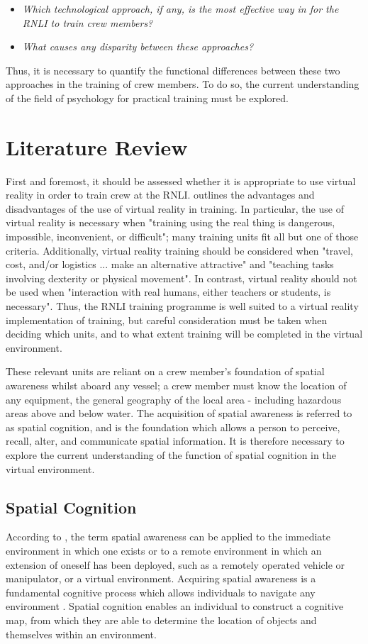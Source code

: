 \documentclass[ %
                    author={Elis Jones},
                supervisor={Dr. Kirsten Cater},
                    degree={BSc},
                     title={The Effect of Presentation Medium on Spatial Cognition},
                  subtitle={in the Virtual Environment},
                      year={2018} ]{dissertation}
\begin{document}
\begin{itemize}
    \item \textit{Which technological approach, if any, is the most effective way in for the RNLI to train crew members?}
    \item \textit{What causes any disparity between these approaches?}
\end{itemize}

Thus, it is necessary to quantify the functional differences between these two approaches in the training of crew members. To do so, the current understanding of the field of psychology for practical training must be explored.

\section{Literature Review}\label{litreview}
First and foremost, it should be assessed whether it is appropriate to use virtual reality in order to train crew at the RNLI. \cite{Pantelidis2010} outlines the advantages and disadvantages of the use of virtual reality in training. In particular, the use of virtual reality is necessary when "training using the real thing is dangerous, impossible, inconvenient, or difficult"; many training units fit all but one of those criteria. Additionally, virtual reality training should be considered when "travel, cost, and/or logistics ... make an alternative attractive" and "teaching tasks involving dexterity or physical movement". In contrast, virtual reality should not be used when "interaction with real humans, either teachers or students, is necessary". Thus, the RNLI training programme is well suited to a virtual reality implementation of training, but careful consideration must be taken when deciding which units, and to what extent training will be completed in the virtual environment. 

These relevant units are reliant on a crew member's foundation of spatial awareness whilst aboard any vessel; a crew member must know the location of any equipment, the general geography of the local area - including hazardous areas above and below water. The acquisition of spatial awareness is referred to as spatial cognition, and is the foundation which allows a person to perceive, recall, alter, and communicate spatial information. It is therefore necessary to explore the current understanding of the function of spatial cognition in the virtual environment.

\subsection{Spatial Cognition}
According to \cite{stone}, the term spatial awareness can be applied to the immediate environment in which one exists or to a remote environment in which an extension of oneself has been deployed, such as a remotely operated vehicle or manipulator, or a virtual environment. Acquiring spatial awareness is a fundamental cognitive process which allows individuals to navigate any environment \citep{Michael2008}. Spatial cognition enables an individual to construct a cognitive map, from which they are able to determine the location of objects and themselves within an environment. \citep{downs}
\end{document}
